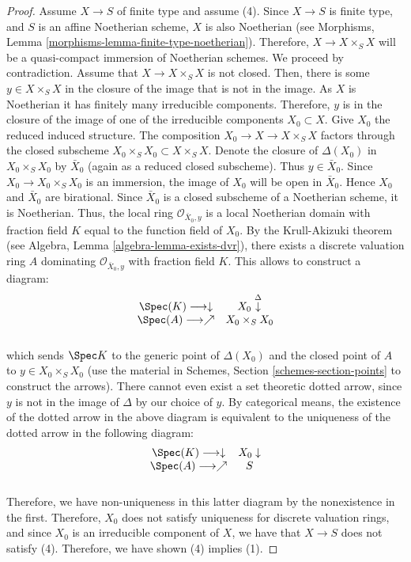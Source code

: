 \begin{proof}
\medskip\noindent
Assume $X \to S$ of finite type and assume (4).
Since $X \to S$ is finite type, and $S$ is an affine Noetherian
scheme, $X$ is also Noetherian (see
Morphisms, Lemma \ref{morphisms-lemma-finite-type-noetherian}).
Therefore, $X \to X \times_S X$ will
be a quasi-compact immersion of Noetherian schemes.  We proceed by
contradiction.  Assume that $X \to X \times_S X$ is not closed.  Then,
there is some $y \in X \times_S X$ in the closure of the image that is
not in the image. As $X$ is Noetherian it has finitely many irreducible
components. Therefore, $y$ is in the closure of the image of one of
the irreducible components $X_0 \subset X$.  Give $X_0$ the reduced
induced structure.  The composition $X_0 \to X \to X \times_S X$
factors through the closed subscheme $X_0 \times_S X_0 \subset X \times_S X$.
Denote the closure of $\Delta(X_0)$ in $X_0 \times_S X_0$
by $\bar X_0$ (again as a reduced closed subscheme). Thus $y \in \bar X_0$.
Since $X_0 \to X_0 \times_S X_0$ is an immersion, the image of $X_0$
will be open in $\bar X_0$. Hence $X_0$ and $\bar X_0$ are
birational. Since $\bar{X}_0$ is a closed subscheme of a
Noetherian scheme, it is Noetherian. Thus, the local ring
$\mathcal O_{{\bar X_0, y}}$ is a local Noetherian domain with fraction
field $K$ equal to the function field of $X_0$.  By the Krull-Akizuki
theorem (see Algebra, Lemma \ref{algebra-lemma-exists-dvr}), there exists a
discrete valuation ring $A$ dominating $\mathcal O_{{\bar X_0, y}}$
with fraction field $K$.  This allows to construct a diagram:
\begin{equation}
\label{equation-valuative-generic}
\begin{array}{cc}\Spec(K) \longrightarrow\downarrow & X_0 \overset{\Delta}{\downarrow} \\ \Spec(A) \longrightarrow\nearrow & X_0 \times_S X_0 \\  & \end{array}
\end{equation}
which sends $\Spec K$ to the generic point of $\Delta(X_0)$ and
the closed point of $A$ to $y \in X_0 \times_S X_0$ (use the material in
Schemes, Section \ref{schemes-section-points} to construct the arrows).
There cannot even exist
a set theoretic dotted arrow, since $y$ is not in the image of
$\Delta$ by our choice of $y$.  By categorical means, the existence of
the dotted arrow in the above diagram is equivalent to the uniqueness
of the dotted arrow in the following diagram:
\begin{equation}
\label{equation-valuative-nonexistent}
\begin{array}{cc}\Spec(K) \longrightarrow\downarrow & X_0 \downarrow \\ \Spec(A) \longrightarrow\nearrow & S \\  & \end{array}
\end{equation}
Therefore, we have non-uniqueness in this latter diagram by the
nonexistence in the first.  Therefore, $X_0$ does not satisfy
uniqueness for discrete valuation rings, and since $X_0$ is an
irreducible component of $X$, we have that $X \to S$ does not satisfy
(4).  Therefore, we have shown (4) implies (1).
\end{proof}


